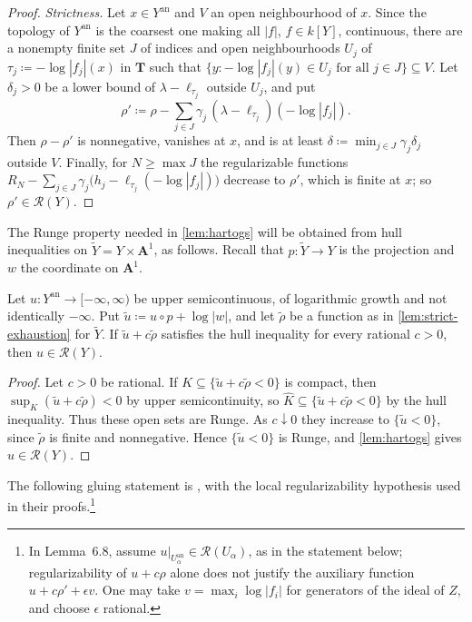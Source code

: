 \documentclass[11pt,a4paper]{article}
\newcommand{\an}{\mathrm{an}}          %
\begin{document}
\begin{proof}
\emph{Strictness.} Let $x\in Y^{\an}$ and $V$ an open neighbourhood of $x$. Since the topology of $Y^{\an}$ is the coarsest one making all $|f|$, $f\in k[Y]$, continuous, there are a nonempty finite set $J$ of indices and open neighbourhoods $U_j$ of $\tau_j\coloneqq-\log|f_j|(x)$ in $\mathbf T$ such that $\{y:-\log|f_j|(y)\in U_j\text{ for all }j\in J\}\subseteq V$. Let $\delta_j>0$ be a lower bound of $\lambda-\ell_{\tau_j}$ outside $U_j$, and put
\[
\rho'\coloneqq\rho-\sum_{j\in J}\gamma_j\,(\lambda-\ell_{\tau_j})(-\log|f_j|).
\]
Then $\rho-\rho'$ is nonnegative, vanishes at $x$, and is at least $\delta\coloneqq\min_{j\in J}\gamma_j\delta_j$ outside $V$. Finally, for $N\ge\max J$ the regularizable functions $R_N-\sum_{j\in J}\gamma_j\bigl(h_j-\ell_{\tau_j}(-\log|f_j|)\bigr)$ decrease to $\rho'$, which is finite at $x$; so $\rho'\in\mathcal{R}(Y)$.
\end{proof}

The Runge property needed in \cref{lem:hartogs} will be obtained from hull inequalities on $\widetilde Y=Y\times\mathbf A^1$, as follows. Recall that $p\colon\widetilde Y\to Y$ is the projection and $w$ the coordinate on $\mathbf A^1$.

\begin{lemma}\label{lem:hull-criterion}
Let $u\colon Y^{\an}\to[-\infty,\infty)$ be upper semicontinuous, of logarithmic growth and not identically $-\infty$. Put $\widetilde u\coloneqq u\circ p+\log|w|$, and let $\widetilde\rho$ be a function as in \cref{lem:strict-exhaustion} for $\widetilde Y$. If $\widetilde u+c\widetilde\rho$ satisfies the hull inequality for every rational $c>0$, then $u\in\mathcal{R}(Y)$.
\end{lemma}

\begin{proof}
Let $c>0$ be rational. If $K\subseteq\{\widetilde u+c\widetilde\rho<0\}$ is compact, then $\sup_K(\widetilde u+c\widetilde\rho)<0$ by upper semicontinuity, so $\widehat K\subseteq\{\widetilde u+c\widetilde\rho<0\}$ by the hull inequality. Thus these open sets are Runge. As $c\downarrow0$ they increase to $\{\widetilde u<0\}$, since $\widetilde\rho$ is finite and nonnegative. Hence $\{\widetilde u<0\}$ is Runge, and \cref{lem:hartogs} gives $u\in\mathcal{R}(Y)$.
\end{proof}

The following gluing statement is \cite[Lemma~6.8 and Corollary~6.9]{Wu26}, with the local regularizability hypothesis used in their proofs.\footnote{In Lemma~6.8, assume $u|_{U_\alpha^{\an}}\in\mathcal{R}(U_\alpha)$, as in the statement below; regularizability of $u+c\rho$ alone does not justify the auxiliary function $u+c\rho'+\epsilon v$. One may take $v=\max_i\log|f_i|$ for generators of the ideal of $Z$, and choose $\epsilon$ rational.}
\end{document}
